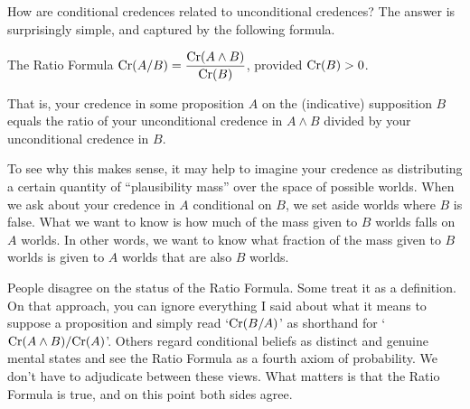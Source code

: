 



How are conditional credences related to unconditional credences?
The answer is surprisingly simple, and captured by the following
formula.
\begin{genericthm}{The Ratio Formula}
  \leavevmode\vspace{-3mm}
  \quad\newline
  $\text{Cr}(A/B) = \dfrac{\text{Cr}(A \land B)}{\text{Cr}(B)}$, provided $\text{Cr}(B)>0$.
\end{genericthm}
That is, your credence in some proposition $A$ on the (indicative)
supposition $B$ equals the ratio of your unconditional
credence in $A \land B$ divided by your unconditional credence in $B$.

To see why this makes sense, it may help to imagine your credence as
distributing a certain quantity of ``plausibility mass'' over
the space of possible worlds. When we ask about your credence in
$A$ conditional on $B$, we set aside worlds where $B$ is false. What
we want to know is how much of the mass given to $B$ worlds falls on
$A$ worlds. In other words, we want to know what fraction of the mass
given to $B$ worlds is given to $A$ worlds that are also $B$ worlds.

People disagree on the status of the Ratio Formula. Some treat it as a
definition. On that approach, you can ignore everything I said about
what it means to suppose a proposition and simply read `$\text{Cr}(B/A)$' as
shorthand for `$\text{Cr}(A \land B)/\text{Cr}(A)$'. Others regard conditional
beliefs as distinct and genuine mental states and see the Ratio
Formula as a fourth axiom of probability. We
don't have to adjudicate between these views. What matters is that the
Ratio Formula is true, and on this point both sides agree.

